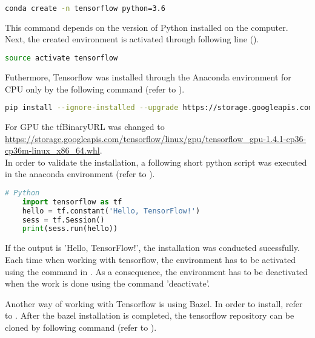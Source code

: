\begin{lstlisting}[caption=Creating an Anaconda environment, label=list:tensorflow_anaconda, language=bash]
	conda create -n tensorflow python=3.6
\end{lstlisting}

This command depends on the version of Python installed on the computer. Next, the created environment is activated through following line ().

\begin{lstlisting}[caption=Activating the Anaconda environment, label=list:activation_anaconda, language=bash]
	source activate tensorflow
\end{lstlisting}

Futhermore, Tensorflow was installed through the Anaconda environment for CPU only by the following command (refer to ).

\begin{lstlisting}[caption=Installing Tensorflow through Anaconda, label=list:installing_tensorflow_anaconda, language=bash]
	pip install --ignore-installed --upgrade https://storage.googleapis.com/tensorflow/linux/cpu/	tensorflow-1.4.1-cp36-cp36m-linux_x86_64.whl
\end{lstlisting}

For GPU the tfBinaryURL was changed to \url{https://storage.googleapis.com/tensorflow/linux/gpu/tensorflow_gpu-1.4.1-cp36-cp36m-linux_x86_64.whl}. \\

In order to validate the installation, a following short python script was executed in the anaconda environment (refer to ).

\begin{lstlisting}[caption=Installing Tensorflow through Anaconda, label=list:validation_installation, language=python]
	# Python
	import tensorflow as tf
	hello = tf.constant('Hello, TensorFlow!')
	sess = tf.Session()
	print(sess.run(hello))
\end{lstlisting}

If the output is 'Hello, TensorFlow!', the installation was conducted sucessfully. Each time when working with tensorflow, the environment has to be activated using the command in . As a consequence, the environment has to be deactivated when the work is done using the command 'deactivate'.

Another way of working with Tensorflow is using Bazel. In order to install, refer to . 
After the bazel installation is completed, the tensorflow repository can be cloned by following command (refer to ).

